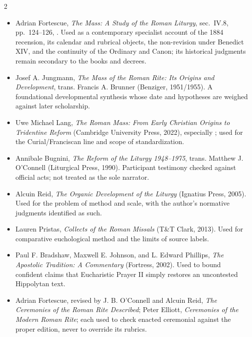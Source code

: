 \begin{multicols}{2}
\begin{itemize}[itemsep=0.12em,topsep=0.15em]
\item Adrian Fortescue, \emph{The Mass: A Study of the Roman Liturgy}, sec.~IV.8, pp.~124--126, . Used as a contemporary specialist account of the 1884 recension, its calendar and rubrical objects, the non-revision under Benedict XIV, and the continuity of the Ordinary and Canon; its historical judgments remain secondary to the books and decrees.
\item Josef A. Jungmann, \emph{The Mass of the Roman Rite: Its Origins and Development}, trans. Francis A. Brunner (Benziger, 1951/1955). A foundational developmental synthesis whose date and hypotheses are weighed against later scholarship.
\item Uwe Michael Lang, \emph{The Roman Mass: From Early Christian Origins to Tridentine Reform} (Cambridge University Press, 2022), especially ; used for the Curial/Franciscan line and scope of standardization.
\item Annibale Bugnini, \emph{The Reform of the Liturgy 1948--1975}, trans. Matthew J. O'Connell (Liturgical Press, 1990). Participant testimony checked against official acts; not treated as the sole narrator.
\item Alcuin Reid, \emph{The Organic Development of the Liturgy} (Ignatius Press, 2005). Used for the problem of method and scale, with the author's normative judgments identified as such.
\item Lauren Pristas, \emph{Collects of the Roman Missals} (T\&T Clark, 2013). Used for comparative euchological method and the limits of source labels.
\item Paul F. Bradshaw, Maxwell E. Johnson, and L. Edward Phillips, \emph{The Apostolic Tradition: A Commentary} (Fortress, 2002). Used to bound confident claims that Eucharistic Prayer II simply restores an uncontested Hippolytan text.
\item Adrian Fortescue, revised by J. B. O'Connell and Alcuin Reid, \emph{The Ceremonies of the Roman Rite Described}; Peter Elliott, \emph{Ceremonies of the Modern Roman Rite}; each used to check enacted ceremonial against the proper edition, never to override its rubrics.
\end{itemize}

\end{multicols}
\endgroup
